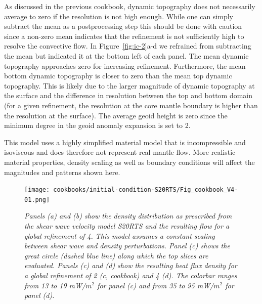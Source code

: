 \documentclass{article}
\begin{document}
As discussed in the previous cookbook, dynamic topography does not necessarily 
average to zero if the resolution is not high enough. While one can simply subtract
the mean as a postprocessing step this should be done with caution since a non-zero
mean indicates that the refinement is not sufficiently high to resolve the
convective flow. In Figure~\ref{fig:ic-2}a-d we refrained from subtracting the mean but 
indicated it at the bottom left of each panel. The mean dynamic 
topography approaches zero for increasing refinement. Furthermore, the mean bottom 
dynamic topography is closer to zero than the mean top dynamic topography. This is 
likely due to the larger magnitude of dynamic topography at the surface and the
difference in resolution between the top and bottom domain
(for a given refinement, the resolution at the core mantle boundary is
higher than the resolution at the surface). The average geoid height is zero since
the minimum degree in the geoid anomaly expansion is set to 2. 

This model uses a highly simplified material model that is incompressible and 
isoviscous and does therefore not represent real mantle flow. More realistic 
material properties, density scaling as well as boundary conditions will affect the magnitudes
and patterns shown here. 

\begin{figure}
  \texttt{[image: cookbooks/initial-condition-S20RTS/Fig\_cookbook\_V4-01.png]}
  \hfill
  \caption{\it Panels (a) and (b) show the density distribution as prescribed from the shear
  wave velocity model S20RTS and the resulting flow for a global refinement of 4. This
  model assumes a constant scaling between shear wave and density perturbations.
  Panel (c) shows the great circle (dashed blue line) along which the top slices
  are evaluated. Panels (c) and (d) show the resulting heat flux density for a global refinement of
  2 (c, cookbook) and 4 (d). The colorbar ranges from 13 to 19 mW/$m^2$ for panel (c) and
  from 35 to 95 mW/$m^2$ for panel (d).}
  \label{fig:ic-1}
\end{figure}
\end{document}
